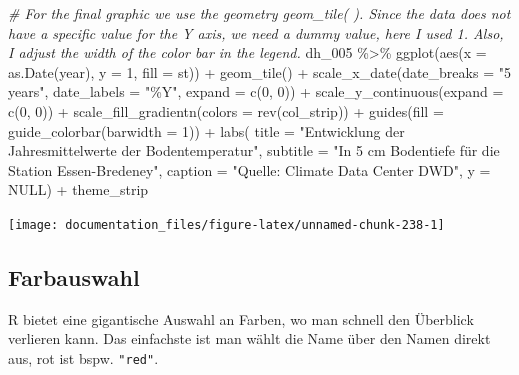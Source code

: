 \documentclass[
]{article}
\newenvironment{Shaded}{\begin{snugshade}}{\end{snugshade}}
\newcommand{\AttributeTok}[1]{\textcolor[rgb]{0.77,0.63,0.00}{#1}}
\newcommand{\CommentTok}[1]{\textcolor[rgb]{0.56,0.35,0.01}{\textit{#1}}}
\newcommand{\ConstantTok}[1]{\textcolor[rgb]{0.00,0.00,0.00}{#1}}
\newcommand{\DecValTok}[1]{\textcolor[rgb]{0.00,0.00,0.81}{#1}}
\newcommand{\FunctionTok}[1]{\textcolor[rgb]{0.00,0.00,0.00}{#1}}
\newcommand{\NormalTok}[1]{#1}
\newcommand{\SpecialCharTok}[1]{\textcolor[rgb]{0.00,0.00,0.00}{#1}}
\newcommand{\StringTok}[1]{\textcolor[rgb]{0.31,0.60,0.02}{#1}}
\begin{document}
\begin{Shaded}
\begin{Highlighting}[]
\CommentTok{\# For the final graphic we use the geometry geom\_tile( ). Since the data does not have a specific value for the Y axis, we need a dummy value, here I used 1. Also, I adjust the width of the color bar in the legend.}
\NormalTok{dh\_005 }\SpecialCharTok{\%\textgreater{}\%}
  \FunctionTok{ggplot}\NormalTok{(}\FunctionTok{aes}\NormalTok{(}\AttributeTok{x =} \FunctionTok{as.Date}\NormalTok{(year), }\AttributeTok{y =} \DecValTok{1}\NormalTok{, }\AttributeTok{fill =}\NormalTok{ st)) }\SpecialCharTok{+}
  \FunctionTok{geom\_tile}\NormalTok{() }\SpecialCharTok{+}
  \FunctionTok{scale\_x\_date}\NormalTok{(}\AttributeTok{date\_breaks =} \StringTok{"5 years"}\NormalTok{,}
               \AttributeTok{date\_labels =} \StringTok{"\%Y"}\NormalTok{,}
               \AttributeTok{expand =} \FunctionTok{c}\NormalTok{(}\DecValTok{0}\NormalTok{, }\DecValTok{0}\NormalTok{)) }\SpecialCharTok{+}
  \FunctionTok{scale\_y\_continuous}\NormalTok{(}\AttributeTok{expand =} \FunctionTok{c}\NormalTok{(}\DecValTok{0}\NormalTok{, }\DecValTok{0}\NormalTok{)) }\SpecialCharTok{+}
  \FunctionTok{scale\_fill\_gradientn}\NormalTok{(}\AttributeTok{colors =} \FunctionTok{rev}\NormalTok{(col\_strip)) }\SpecialCharTok{+}
  \FunctionTok{guides}\NormalTok{(}\AttributeTok{fill =} \FunctionTok{guide\_colorbar}\NormalTok{(}\AttributeTok{barwidth =} \DecValTok{1}\NormalTok{)) }\SpecialCharTok{+}
  \FunctionTok{labs}\NormalTok{(}
    \AttributeTok{title =} \StringTok{"Entwicklung der Jahresmittelwerte der Bodentemperatur"}\NormalTok{,}
    \AttributeTok{subtitle =} \StringTok{"In 5 cm Bodentiefe für die Station Essen{-}Bredeney"}\NormalTok{,}
    \AttributeTok{caption =} \StringTok{"Quelle: Climate Data Center DWD"}\NormalTok{, }
    \AttributeTok{y =} \ConstantTok{NULL}\NormalTok{) }\SpecialCharTok{+}
\NormalTok{  theme\_strip}
\end{Highlighting}
\end{Shaded}

\begin{center}\texttt{[image: documentation\_files/figure-latex/unnamed-chunk-238-1]} \end{center}

\hypertarget{farbauswahl}{%
\subsection{Farbauswahl}\label{farbauswahl}}

R bietet eine gigantische Auswahl an Farben, wo man schnell den Überblick verlieren kann.
Das einfachste ist man wählt die Name über den Namen direkt aus, rot ist bspw. \texttt{"red"}.
\end{document}
